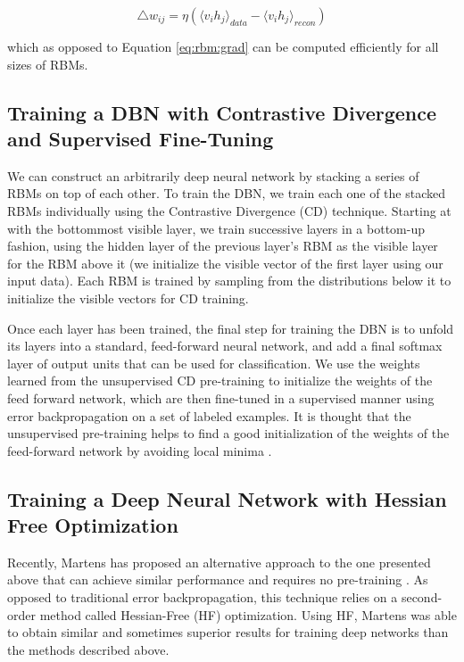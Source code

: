 \documentclass{article}
\begin{document}
\[
  \triangle w_{ij} = \eta( 
  \langle v_i h_j \rangle_{data} - \langle v_i h_j \rangle_{recon}
  )
\]

which as opposed to Equation \ref{eq:rbm:grad} can be computed efficiently for
all sizes of RBMs.

\subsection{Training a DBN with Contrastive Divergence and Supervised Fine-Tuning}

We can construct an arbitrarily deep neural network by stacking a series of
RBMs on top of each other. To train the DBN, we train each one of the stacked
RBMs individually using the Contrastive Divergence (CD) technique. Starting at
with the bottommost visible layer, we train successive layers in a bottom-up
fashion, using the hidden layer of the previous layer's RBM as the visible
layer for the RBM above it (we initialize the visible vector of the first layer
using our input data). Each RBM is trained by sampling from the distributions
below it to initialize the visible vectors for CD training.

Once each layer has been trained, the final step for training the DBN is to
unfold its layers into a standard, feed-forward neural network, and add a final
softmax layer of output units that can be used for classification. We use the
weights learned from the unsupervised CD pre-training to initialize the weights
of the feed forward network, which are then fine-tuned in a supervised manner
using error backpropagation on a set of labeled examples. It is thought that
the unsupervised pre-training helps to find a good initialization of the weights
of the feed-forward network by avoiding local minima \cite{Bengio:2009:LDA}.

\subsection{Training a Deep Neural Network with Hessian Free Optimization}

Recently, Martens has proposed an alternative approach to the one presented
above that can achieve similar performance and requires no pre-training
\cite{martens2010deep}.  As opposed to traditional error backpropagation, this
technique relies on a second-order method called Hessian-Free (HF)
optimization. Using HF, Martens was able to obtain similar and sometimes
superior results for training deep networks than the methods described above.
\end{document}

